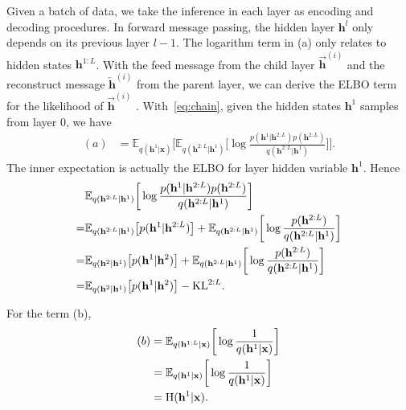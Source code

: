 \documentclass{article} %
\begin{document}
Given a batch of data, we take the inference in each layer as encoding and decoding procedures. In forward message passing, the hidden layer $\mathbf{h}^l$  only depends on its previous layer $l-1$. 
The logarithm term in (a) only relates to hidden states $\mathbf{h}^{1:L}$.  With the feed message from the child layer $\overrightarrow{\mathbf{h}}^{(i)}$ and the reconstruct message $\overleftarrow{\mathbf{h}}^{(i)}$  from the parent layer, we can derive the ELBO term for the likelihood of  $\overrightarrow{\mathbf{h}}^{(i)}$ .  With~\eqref{eq:chain}, given the hidden states $\mathbf{h}^1$ samples from layer 0, we have 
\begin{align} \label{eq:kl_a}
(a)  &=   \mathbb{E}_{q(\mathbf{h}^{1}|\mathbf{x})} \bigg[  \mathbb{E}_{q(\mathbf{h}^{2:L}|\mathbf{h}^1)} \bigg[ \log  \frac{p( \mathbf{h}^{1}|  \mathbf{h}^{2:L}) p( \mathbf{h}^{2:L})  }{ q(\mathbf{h}^{2:L}|\mathbf{h}^1)}  \bigg]    \bigg] .
\end{align}
The inner expectation is actually the ELBO for layer hidden variable $\mathbf{h}^1$. Hence
\begin{align} \notag
 &\mathbb{E}_{q(\mathbf{h}^{2:L}|\mathbf{h}^1)} \bigg[ \log  \frac{p( \mathbf{h}^{1}|  \mathbf{h}^{2:L}) p( \mathbf{h}^{2:L})  }{ q(\mathbf{h}^{2:L}|\mathbf{h}^1)}  \bigg]   \\ \notag
 =&\mathbb{E}_{q(\mathbf{h}^{2:L}|\mathbf{h}^1)} \big[  p( \mathbf{h}^{1}|  \mathbf{h}^{2:L})    \big] + \mathbb{E}_{q(\mathbf{h}^{2:L}|\mathbf{h}^1)} \bigg[ \log  \frac{ p( \mathbf{h}^{2:L})   }{ q(\mathbf{h}^{2:L}|\mathbf{h}^1)}  \bigg]  \\  \label{eq:a_inner}
 =&  \mathbb{E}_{q(\mathbf{h}^{2}|\mathbf{h}^1)} \big[  p( \mathbf{h}^{1}|  \mathbf{h}^{2})    \big] + \mathbb{E}_{q(\mathbf{h}^{2:L}|\mathbf{h}^1)} \bigg[ \log  \frac{ p( \mathbf{h}^{2:L})   }{ q(\mathbf{h}^{2:L}|\mathbf{h}^1)}  \bigg] \\ \notag
  =&  \mathbb{E}_{q(\mathbf{h}^{2}|\mathbf{h}^1)} \big[  p( \mathbf{h}^{1}|  \mathbf{h}^{2})    \big] - \text{KL}^{2:L} .
\end{align}

For the term (b),
\begin{align} \notag
 (b) & = \mathbb{E}_{q(\mathbf{h}^{1:L} | \mathbf{x})} \bigg[ \log \frac{1}{q(\mathbf{h}^{1}|\mathbf{x}) } \bigg] \\ \notag
&=  \mathbb{E}_{q(\mathbf{h}^{1} | \mathbf{x})} \bigg[ \log \frac{1}{q(\mathbf{h}^{1}|\mathbf{x}) } \bigg] \\ \label{eq:kl_b}
& = \text{H}(\mathbf{h}^{1}|\mathbf{x}) .
\end{align}
\end{document}
